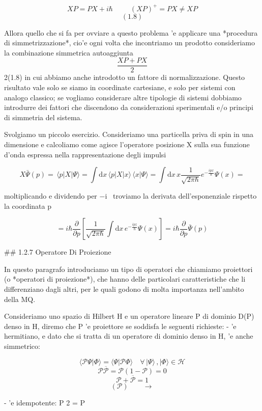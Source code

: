 {	$$X P=P X+i\hbar\ \ \ \ \ \ \ \ \ \ \ (X P)^{+}=P X\neq X P$$
	$$(1.8)$$
	
	Allora quello che si fa per ovviare a questo problema 'e applicare una *procedura di simmetrizzazione*, cio'e ogni
	volta che incontriamo un prodotto consideriamo la combinazione simmetrica autoaggiunta
	$$\frac{X P+P X}{2}$$
	2(1.8)
	in cui abbiamo anche introdotto un fattore di normalizzazione. Questo risultato vale solo se siamo in coordinate cartesiane, e solo per sistemi con analogo classico; se vogliamo considerare altre tipologie di sistemi dobbiamo introdurre dei fattori che discendono da considerazioni sperimentali e/o principi di simmetria del sistema.
	
	Svolgiamo un piccolo esercizio. Consideriamo una particella priva di spin in una dimensione e calcoliamo come agisce l'operatore posizione X sulla sua funzione d'onda espressa nella rappresentazione degli impulsi
	
	$$X\bar{\Psi}(p)=\,\langle p|X|\Psi\rangle=\int\mathrm{d}x\,\langle p|X|x\rangle\,\langle x|\Psi\rangle=\int\mathrm{d}x\,x\frac{1}{\sqrt{2\pi\hbar}}e^{-\frac{i p x}{\hbar}}\Psi(x)=$$
	
	moltiplicando e dividendo per −i~ troviamo la derivata dell'esponenziale rispetto la coordinata p
	
	$$=i\hbar{\frac{\partial}{\partial p}}\left[{\frac{1}{\sqrt{2\pi\hbar}}}\int\mathrm{d}x\,e^{-{\frac{i p z}{\hbar}}}\Psi(x)\right]=i\hbar{\frac{\partial}{\partial p}}{\bar{\Psi}}(p)$$
	
	## 1.2.7 Operatore Di Proiezione
	
	In questo paragrafo introduciamo un tipo di operatori che chiamiamo proiettori (o *operatori di proiezione*), che hanno delle particolari caratteristiche che li differenziano dagli altri, per le quali godono di molta importanza nell'ambito della MQ.
	
	Consideriamo uno spazio di Hilbert H e un operatore lineare P di dominio D(P) denso in H, diremo che P 'e proiettore se soddisfa le seguenti richieste:
	- 'e hermitiano, e dato che si tratta di un operatore di dominio denso in H, 'e anche simmetrico:
	
	$$\langle{\mathcal{P}}\Psi|\Phi\rangle=\langle\Psi|{\mathcal{P}}\Phi\rangle\quad\forall\,|\Psi\rangle\,,|\Phi\rangle\in{\mathcal{H}}$$
	$${\mathcal{P}}{\overline{{{\mathcal{P}}}}}={\mathcal{P}}(1-{\mathcal{P}})=0$$
	$${\mathcal{P}}+{\overline{{{\mathcal{P}}}}}=1$$
	$$({\mathcal{P}})\qquad\longrightarrow$$
	
	- 'e idempotente: P
	2 = P
	
}
